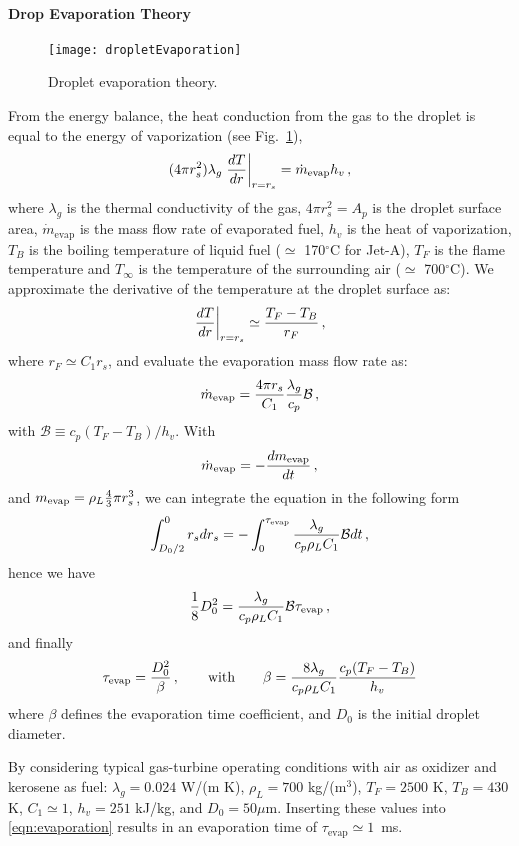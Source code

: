 \paragraph{Drop Evaporation Theory}
\begin{figure}[!h!]
 \centering
    {\texttt{[image: dropletEvaporation]}}
    \caption{\label{FIG_DROPLET_EVAP}Droplet evaporation theory.}
\end{figure}
From the energy balance, the heat conduction from the gas to the droplet is equal to the energy of vaporization (see Fig.~\ref{FIG_DROPLET_EVAP}),
\begin{equation}
  (4 \pi r_s^2) \lambda_g \left.{\frac{dT}{dr}}\right|_{r = r_s} = \dot{m}_\text{evap} h_v\,,
\end{equation}
where $\lambda_g$ is the thermal conductivity of the gas, $4\pi r_s^2 = A_p$ is the droplet surface area, $\dot{m}_\text{evap}$ is the mass flow rate of evaporated fuel, $h_v$ is the heat of vaporization, $T_B$ is the boiling temperature of liquid fuel ($\simeq$ 170$^\circ$C for Jet-A), $T_F$ is the flame temperature and $T_\infty$ is the temperature of the surrounding air ($\simeq$ 700$^\circ$C). We approximate the derivative of the temperature at the droplet surface as:
\[
\left.{\frac{dT}{dr}}\right|_{r = r_s} \simeq {\frac{T_F-T_B}{r_F}}\,,
\]
where $r_F \simeq C_1 r_s$, and evaluate the evaporation mass flow rate as:
\[
\dot{m}_\text{evap} = {\frac{4\pi r_s}{C_1}} {\frac{\lambda_g}{c_p}} \mathcal{B}\,,
\]
with $\mathcal{B} \equiv c_p (T_F-T_B)/h_v$. With
\[
\dot{m}_\text{evap} = - {\frac{d m_\text{evap}}{dt}}\,,
\]
and $m_\text{evap} = \rho_L {\frac{4}{3}} \pi r_s^3$, we can integrate the equation in the following form
\[
\int^0_{D_0/2} r_s dr_s = - \int_0^{\tau_\text{evap}} {\frac{\lambda_g}{c_p \rho_L C_1}}\mathcal{B} dt\,,
\]
hence we have
\[
{\frac{1}{8}} D_0^2 = {\frac{\lambda_g}{c_p \rho_L C_1}} \mathcal{B} \tau_\text{evap}\,,
\]
and finally 
\begin{equation}
  \label{eqn:evaporation}
  \tau_\text{evap} = {\frac{D_0^2}{\beta}}\,,\qquad\text{with}\qquad
  \beta = {\frac{8\lambda_g}{c_p \rho_L C_1}} {\frac{c_p (T_F-T_B)}{h_v}}
\end{equation}
where $\beta$ defines the evaporation time coefficient, and $D_0$ is the initial droplet diameter.

By considering typical gas-turbine operating conditions with air as oxidizer and kerosene as fuel: $\lambda_g =0.024$ W/(m K), $\rho_L=700$ kg/(m$^3$), $T_F =2500$ K, $T_B=430$ K, $C_1 \simeq 1$, $h_v =251$ kJ/kg, and $D_0 =50 \mu$m. Inserting these values into \cref{eqn:evaporation} results in an evaporation time of $\tau_\text{evap} \simeq 1$~ms.

